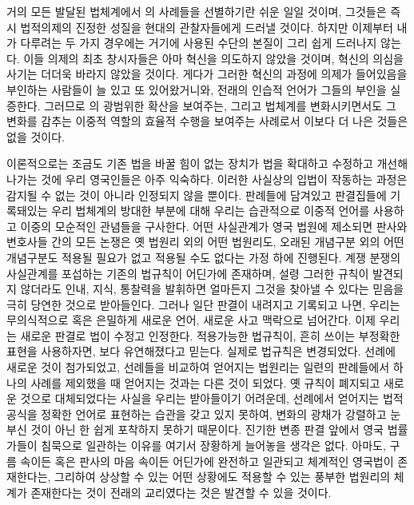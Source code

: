 거의 모든 발달된 법체계에서 의 사례들을 선별하기란
쉬운 일일 것이며, 그것들은 즉시 법적의제의 진정한 성질을 현대의 관찰자들에게
드러낼 것이다.
하지만 이제부터 내가 다루려는 두 가지 경우에는
거기에 사용된 수단의 본질이 그리 쉽게 드러나지 않는다.
이들 의제의 최초 창시자들은 아마 혁신을 의도하지 않았을 것이며,
혁신의 의심을 사기는 더더욱 바라지 않았을 것이다.
게다가 그러한 혁신의 과정에 의제가 들어있음을 부인하는
사람들이 늘 있고 또 있어왔거니와,
전래의 인습적 언어가 그들의 부인을 실증한다.
그러므로 의 광범위한 확산을 보여주는,
그리고 법체계를 변화시키면서도 그 변화를 감추는 이중적 역할의
효율적 수행을 보여주는 사례로서 이보다 더 나은 것들은 없을 것이다.

이론적으로는 조금도 기존 법을 바꿀 힘이 없는 장치가
법을 확대하고 수정하고 개선해나가는 것에
우리 영국인들은 아주 익숙하다.
이러한 사실상의 입법이 작동하는 과정은 감지될 수 없는 것이 아니라
인정되지 않을 뿐이다.
판례들에 담겨있고 판결집들에 기록돼있는 우리 법체계의 방대한 부분에 대해
우리는 습관적으로 이중적 언어를 사용하고 이중의 모순적인 관념들을 구사한다.
어떤 사실관계가 영국 법원에 제소되면
판사와 변호사들 간의 모든 논쟁은
옛 법원리 외의 어떤 법원리도,
오래된 개념구분 외의 어떤 개념구분도
적용될 필요가 없고 적용될 수도 없다는
가정 하에 진행된다.
계쟁 분쟁의 사실관계를 포섭하는 기존의 법규칙이 어딘가에 존재하며,
설령 그러한 규칙이 발견되지 않더라도 인내, 지식, 통찰력을 발휘하면
얼마든지 그것을 찾아낼 수 있다는 믿음을 극히 당연한 것으로 받아들인다.
그러나 일단 판결이 내려지고 기록되고 나면, 우리는 무의식적으로 혹은 은밀하게
새로운 언어, 새로운 사고 맥락으로 넘어간다.
이제 우리는 새로운 판결로 법이 수정고 인정한다.
적용가능한 법규칙이, 흔히 쓰이는 부정확한 표현을 사용하자면,
보다 유연해졌다고 믿는다.
실제로 법규칙은 변경되었다.
선례에 새로운 것이 첨가되었고, 선례들을 비교하여 얻어지는 법원리는
일련의 판례들에서 하나의 사례를 제외했을 때 얻어지는 것과는 다른 것이 되었다.
옛 규칙이 폐지되고 새로운 것으로 대체되었다는 사실을 우리는 받아들이기 어려운데,
선례에서 얻어지는 법적 공식을 정확한 언어로 표현하는 습관을 갖고 있지 못하여,
변화의 광채가 강렬하고 눈부신 것이 아닌 한 쉽게 포착하지 못하기 때문이다.
진기한 변종 판결 앞에서 영국 법률가들이 침묵으로 일관하는
이유를 여기서 장황하게 늘어놓을 생각은 없다.
아마도, 구름 속이든 혹은
판사의 마음 속이든 어딘가에
완전하고 일관되고 체계적인 영국법이 존재한다는, 그리하여 상상할 수 있는 어떤 상황에도
적용할 수 있는 풍부한 법원리의 체계가 존재한다는 것이 전래의 교리였다는 것은
발견할 수 있을 것이다.
